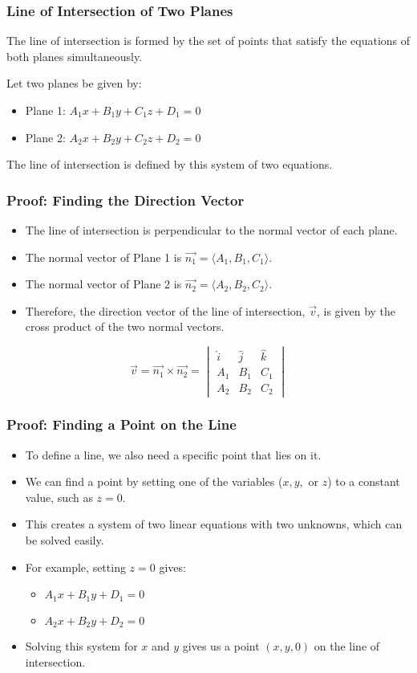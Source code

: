 \begin{frame}
    \frametitle{Line of Intersection of Two Planes}
    The line of intersection is formed by the set of points that satisfy the equations of both planes simultaneously.
    
    Let two planes be given by:
    \begin{itemize}
        \item Plane 1: $A_1x + B_1y + C_1z + D_1 = 0$
        \item Plane 2: $A_2x + B_2y + C_2z + D_2 = 0$
    \end{itemize}
    The line of intersection is defined by this system of two equations.
\end{frame}

\begin{frame}
    \frametitle{Proof: Finding the Direction Vector}
    \begin{itemize}
        \item The line of intersection is perpendicular to the normal vector of each plane.
        \item The normal vector of Plane 1 is $\vec{n_1} = \langle A_1, B_1, C_1 \rangle$.
        \item The normal vector of Plane 2 is $\vec{n_2} = \langle A_2, B_2, C_2 \rangle$.
        \item Therefore, the direction vector of the line of intersection, $\vec{v}$, is given by the cross product of the two normal vectors.
    \end{itemize}
    
    $$\vec{v} = \vec{n_1} \times \vec{n_2} = \begin{vmatrix} \hat{i} & \hat{j} & \hat{k} \\ A_1 & B_1 & C_1 \\ A_2 & B_2 & C_2 \end{vmatrix}$$
\end{frame}

\begin{frame}
    \frametitle{Proof: Finding a Point on the Line}
    \begin{itemize}
        \item To define a line, we also need a specific point that lies on it.
        \item We can find a point by setting one of the variables ($x, y,$ or $z$) to a constant value, such as $z = 0$.
        \item This creates a system of two linear equations with two unknowns, which can be solved easily.
        \item For example, setting $z=0$ gives:
        \begin{itemize}
            \item $A_1x + B_1y + D_1 = 0$
            \item $A_2x + B_2y + D_2 = 0$
        \end{itemize}
        \item Solving this system for $x$ and $y$ gives us a point $(x, y, 0)$ on the line of intersection.
    \end{itemize}
\end{frame}

